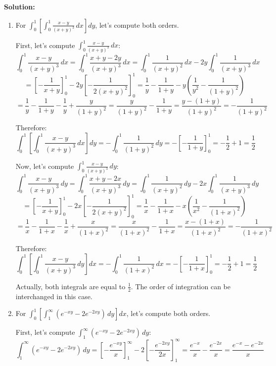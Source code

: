 \bigskip\noindent\textbf{Solution:}
\begin{enumerate}[label=(\alph*)]
    \item For $\int_{0}^{1} \left[ \int_{0}^{1} \frac{x - y}{(x + y)^{3}} \, dx \right] dy$, let's compute both orders.
    
    First, let's compute $\int_{0}^{1} \frac{x - y}{(x + y)^{3}} \, dx$:
    \[\int_{0}^{1} \frac{x - y}{(x + y)^{3}} \, dx = \int_{0}^{1} \frac{x + y - 2y}{(x + y)^{3}} \, dx = \int_{0}^{1} \frac{1}{(x + y)^{2}} \, dx - 2y \int_{0}^{1} \frac{1}{(x + y)^{3}} \, dx\]
    \[= \left[-\frac{1}{x + y}\right]_{0}^{1} - 2y \left[-\frac{1}{2(x + y)^{2}}\right]_{0}^{1} = \frac{1}{y} - \frac{1}{1 + y} - y\left(\frac{1}{y^{2}} - \frac{1}{(1 + y)^{2}}\right)\]
    \[= \frac{1}{y} - \frac{1}{1 + y} - \frac{1}{y} + \frac{y}{(1 + y)^{2}} = \frac{y}{(1 + y)^{2}} - \frac{1}{1 + y} = \frac{y - (1 + y)}{(1 + y)^{2}} = -\frac{1}{(1 + y)^{2}}\]
    
    Therefore:
    \[\int_{0}^{1} \left[ \int_{0}^{1} \frac{x - y}{(x + y)^{3}} \, dx \right] dy = -\int_{0}^{1} \frac{1}{(1 + y)^{2}} \, dy = -\left[-\frac{1}{1 + y}\right]_{0}^{1} = -\frac{1}{2} + 1 = \frac{1}{2}\]
    
    Now, let's compute $\int_{0}^{1} \frac{x - y}{(x + y)^{3}} \, dy$:
    \[\int_{0}^{1} \frac{x - y}{(x + y)^{3}} \, dy = \int_{0}^{1} \frac{x + y - 2x}{(x + y)^{3}} \, dy = \int_{0}^{1} \frac{1}{(x + y)^{2}} \, dy - 2x \int_{0}^{1} \frac{1}{(x + y)^{3}} \, dy\]
    \[= \left[-\frac{1}{x + y}\right]_{0}^{1} - 2x \left[-\frac{1}{2(x + y)^{2}}\right]_{0}^{1} = \frac{1}{x} - \frac{1}{1 + x} - x\left(\frac{1}{x^{2}} - \frac{1}{(1 + x)^{2}}\right)\]
    \[= \frac{1}{x} - \frac{1}{1 + x} - \frac{1}{x} + \frac{x}{(1 + x)^{2}} = \frac{x}{(1 + x)^{2}} - \frac{1}{1 + x} = \frac{x - (1 + x)}{(1 + x)^{2}} = -\frac{1}{(1 + x)^{2}}\]
    
    Therefore:
    \[\int_{0}^{1} \left[ \int_{0}^{1} \frac{x - y}{(x + y)^{3}} \, dy \right] dx = -\int_{0}^{1} \frac{1}{(1 + x)^{2}} \, dx = -\left[-\frac{1}{1 + x}\right]_{0}^{1} = -\frac{1}{2} + 1 = \frac{1}{2}\]
    
    Actually, both integrals are equal to $\frac{1}{2}$. The order of integration can be interchanged in this case.
    
    \item For $\int_{0}^{1} \left[ \int_{1}^{\infty} (e^{-xy} - 2e^{-2xy}) \, dy \right] dx$, let's compute both orders.
    
    First, let's compute $\int_{1}^{\infty} (e^{-xy} - 2e^{-2xy}) \, dy$:
    \[\int_{1}^{\infty} (e^{-xy} - 2e^{-2xy}) \, dy = \left[-\frac{e^{-xy}}{x}\right]_{1}^{\infty} - 2\left[-\frac{e^{-2xy}}{2x}\right]_{1}^{\infty} = \frac{e^{-x}}{x} - \frac{e^{-2x}}{x} = \frac{e^{-x} - e^{-2x}}{x}\]
    

\end{enumerate}
